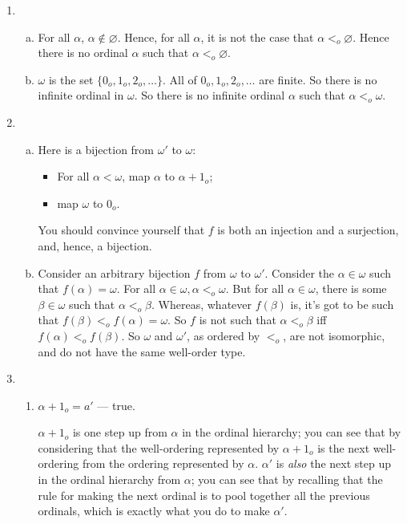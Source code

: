 \documentclass[12pt,a4paper]{article}
\begin{document}
\begin{enumerate}
\item \begin{enumerate}[(a)]
	\item For all $\alpha$, $\alpha\notin\varnothing$. Hence, for all $\alpha$, it is not the case that $\alpha<_o\varnothing$. Hence there is no ordinal $\alpha$ such that $\alpha<_o\varnothing$.
	\item $\omega$ is the set $\{0_o, 1_o, 2_o,\ldots\}$. All of $0_o, 1_o, 2_o,\ldots$ are finite. So there is no infinite ordinal in $\omega$. So there is no infinite ordinal $\alpha$ such that $\alpha<_o\omega$.
	\end{enumerate}

\item \begin{enumerate}[(a)]
	\item Here is a bijection from $\omega'$ to $\omega$: \begin{itemize}
		\item For all $\alpha<\omega$, map $\alpha$ to $\alpha+1_o$; 
		\item map $\omega$ to $0_o$.
		\end{itemize}
		You should convince yourself that $f$ is both an injection and a surjection, and, hence, a bijection.
	\item Consider an arbitrary bijection $f$ from $\omega$ to $\omega'$. Consider the $\alpha\in\omega$ such that $f(\alpha)=\omega$. For all $\alpha\in\omega, \alpha<_o\omega$. But for all $\alpha\in\omega$, there is some $\beta\in\omega$ such that $\alpha<_o\beta$. Whereas, whatever $f(\beta)$ is, it's got to be such that $f(\beta)<_of(\alpha)=\omega$. So $f$ is not such that $\alpha<_o\beta$ iff $f(\alpha)<_of(\beta)$. So $\omega$ and $\omega'$, as ordered by $<_o$, are not isomorphic, and do not have the same well-order type.
	\end{enumerate}

\item \begin{enumerate}
	\item $\alpha+1_o=a'$ --- true.
	
	 $\alpha + 1_o$ is one step up from $\alpha$ in the ordinal hierarchy; you can see that by considering that the well-ordering represented by $\alpha+1_o$ is the next well-ordering from the ordering represented by $\alpha$. $\alpha'$ is \emph{also} the next step up in the ordinal hierarchy from $\alpha$; you can see that by recalling that the rule for making the next ordinal is to pool together all the previous ordinals, which is exactly what you do to make $\alpha'$.
	

\end{enumerate}
\end{enumerate}
\end{document}
